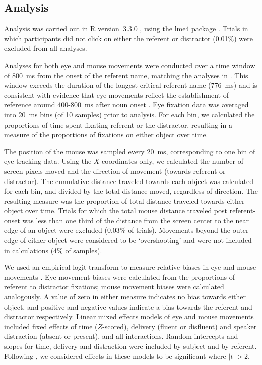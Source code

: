 \documentclass[a4paper,man,natbib]{apa6}
\begin{document}
\subsection{Analysis}
Analysis was carried out in R version~3.3.0 \citep{rbase}, using the lme4 package \citep{lme4}. 
Trials in which participants did not click on either the referent or distractor (0.01\%) were excluded from all analyses. 

Analyses for both eye and mouse movements were conducted over a time window of 800~ms from the onset of the referent name, matching the analyses in \citet{Loy2016}.
This window exceeds the duration of the longest critical referent name (776~ms) and is consistent with evidence that eye movements reflect the establishment of reference around 400-800~ms after noun onset \citep{Eberhard1995}.
Eye fixation data was averaged into 20~ms bins (of 10 samples) prior to analysis.
For each bin, we calculated the proportions of time spent fixating referent or the distractor, resulting in a measure of the proportions of fixations on either object over time.

The position of the mouse was sampled every 20~ms, corresponding to one bin of eye-tracking data.
Using the $X$ coordinates only, we calculated the number of screen pixels moved and the direction of movement (towards referent or distractor).
The cumulative distance traveled towards each object was calculated for each bin, and divided by the total distance moved, regardless of direction.
The resulting measure was the proportion of total distance traveled towards either object over time.
Trials for which the total mouse distance traveled post referent-onset was less than one third of the distance from the screen center to the near edge of an object were excluded (0.03\% of trials). 
Movements beyond the outer edge of either object were considered to be `overshooting' and were not included in calculations (4\% of samples).

We used an empirical logit transform to measure relative biases in eye and mouse movements \citep{Barr2008}.
Eye movement biases were calculated from the proportions of referent to distractor fixations;
mouse movement biases were calculated analogously.
A value of zero in either measure indicates no bias towards either object, and positive and negative values indicate a bias towards the referent and distractor respectively.
Linear mixed effects models of eye and mouse movements included fixed effects of time ($Z$-scored), delivery (fluent or disfluent) and speaker distraction (absent or present), and all interactions.
Random intercepts and slopes for time, delivery and distraction were included by subject and by referent.
Following \citet{baayen2008analyzing}, we considered effects in these models to be significant where $|t|>2$.
\end{document}
